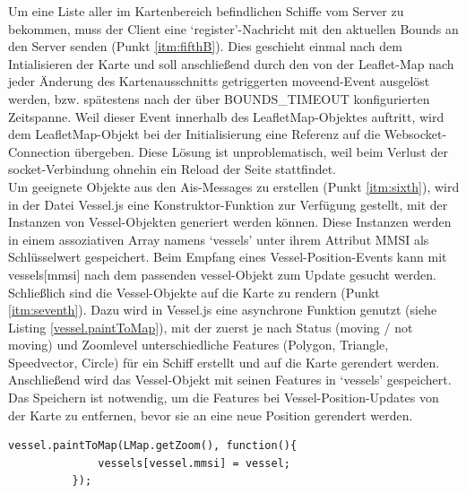 Um eine Liste aller im Kartenbereich befindlichen Schiffe vom Server zu bekommen, muss der Client eine ‘register’-Nachricht mit den aktuellen Bounds an den Server senden (Punkt \ref{itm:fifthB}).
Dies geschieht einmal nach dem Intialisieren der Karte und soll anschließend durch den von der Leaflet-Map nach jeder Änderung des Kartenausschnitts getriggerten moveend-Event ausgelöst werden, bzw. spätestens nach der über BOUNDS\_TIMEOUT konfigurierten Zeitspanne. Weil dieser Event innerhalb des LeafletMap-Objektes auftritt, wird dem LeafletMap-Objekt bei der Initialisierung eine Referenz auf die Websocket-Connection übergeben. Diese Lösung ist unproblematisch, weil beim Verlust der socket-Verbindung ohnehin ein Reload der Seite stattfindet.\\
Um geeignete Objekte aus den Ais-Messages zu erstellen (Punkt \ref{itm:sixth}), wird in der Datei Vessel.js eine Konstruktor-Funktion zur Verfügung gestellt, mit der Instanzen von Vessel-Objekten generiert werden können. Diese Instanzen werden in einem assoziativen Array namens ‘vessels’ unter ihrem Attribut MMSI als Schlüsselwert gespeichert. Beim Empfang eines Vessel-Position-Events kann mit vessels[mmsi] nach dem passenden vessel-Objekt zum Update gesucht werden.\\
Schließlich sind die Vessel-Objekte auf die Karte zu rendern (Punkt \ref{itm:seventh}). Dazu wird in Vessel.js eine asynchrone Funktion genutzt (siehe Listing \ref{vessel.paintToMap}), mit der zuerst je nach Status (moving / not moving) und Zoomlevel unterschiedliche Features (Polygon, Triangle, Speedvector, Circle) für ein Schiff erstellt und auf die Karte gerendert werden. Anschließend wird das Vessel-Objekt mit seinen Features in ‘vessels’ gespeichert. Das Speichern ist notwendig, um die Features bei Vessel-Position-Updates von der Karte zu entfernen, bevor sie an eine neue Position gerendert werden.
\begin{lstlisting}[caption=Aufruf der public function paintToMap des Vessel-Objekts in ais-socket.io.js, label=vessel.paintToMap]
          vessel.paintToMap(LMap.getZoom(), function(){
              vessels[vessel.mmsi] = vessel;
          });
\end{lstlisting}

